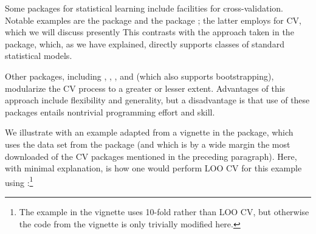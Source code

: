 \documentclass[
]{jss}
\begin{document}
Some  packages for statistical learning include facilities
for cross-validation. Notable examples are the  package
\citep{Kuhn:2008} and the  package \citep{Pfitzinger:2024};
the latter employs  \citep{FrickEtAl:2024} for CV, which we
will discuss presently This contrasts with the approach taken in the
 package, which, as we have explained, directly supports classes
of standard  statistical models.

Other packages, including  \citep{OlsenZachariae:2024},
 \citep{Kapsner:2024}, 
\citep{CoyleEtAl:2022}, and  (which also supports
bootstrapping), modularize the CV process to a greater or lesser extent.
Advantages of this approach include flexibility and generality, but a
disadvantage is that use of these packages entails nontrivial
programming effort and skill.

We illustrate with an example adapted from a vignette in the
 package, which uses the  data set from the
 package \citep{Kuhn:2024} (and which is by a wide margin
the most downloaded of the CV packages mentioned in the preceding
paragraph). Here, with minimal explanation, is how one would perform LOO
CV for this example using :\footnote{The example in the
   vignette uses 10-fold rather than LOO CV, but otherwise
  the code from the vignette is only trivially modified here.}
\end{document}

